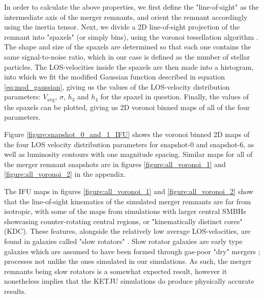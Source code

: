 \documentclass[english, oneside]{HYgradu}
\begin{document}
In order to calculate the above properties, we first define the "line-of-sight" as the intermediate axis of the merger remnants, and orient the remnant accordingly using the inertia tensor. Next, we divide a 2D line-of-sight projection of the remnant into "spaxels" (or simply bins), using the voronoi tessellation algorithm \citep{Cappellari2003}. The shape and size of the spaxels are determined so that each one contains the same signal-to-noise ratio, which in our case is defined as the number of stellar particles. The LOS-velocities inside the spaxels are then made into a histogram, into which we fit the modified Gaussian function described in equation \ref{eq:mod_gaussian}, giving us the values of the LOS-velocity distribution parameters: $V_\mathrm{avg}$, $\sigma$, $h_3$ and $h_4$ for the spaxel in question. Finally, the values of the spaxels can be plotted, giving us 2D voronoi binned maps of all of the four parameters.

Figure \ref{figure:snapshot_0_and_1_IFU} shows the voronoi binned 2D maps of the four LOS velocity distribution parameters for snapshot-0 and snapshot-6, as well as luminosity contours with one magnitude spacing. Similar maps for all of the merger remnant snapshots are in figures \ref{figure:all_voronoi_1} and \ref{figure:all_voronoi_2} in the appendix.

The IFU maps in figures \ref{figure:all_voronoi_1} and \ref{figure:all_voronoi_2} show that the line-of-sight kinematics of the simulated merger remnants are far from isotropic, with some of the maps from simulations with larger central SMBHs showcasing counter-rotating central regions, or "kinematically distinct cores" (KDC). These features, alongside the relatively low average LOS-velocities, are found in galaxies called "slow rotators" \citep{Emsellem2007}. Slow rotator galaxies are early type galaxies which are assumed to have been formed through gas-poor "dry" mergers \citep{Emsellem2007, Cappellari2007}; processes not unlike the ones simulated in our simulations. As such, the merger remnants being slow rotators is a somewhat expected result, however it nonetheless implies that the KETJU simulations do produce physically accurate results.
\end{document}
